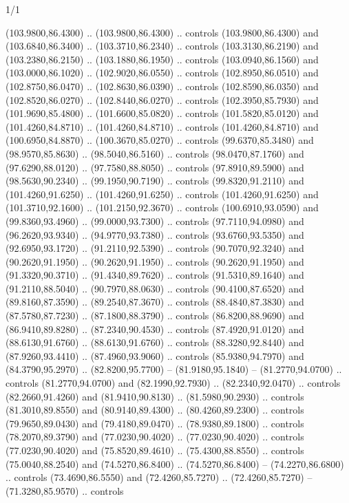 \begin{flagdescription}{1/1}
\begin{scope}[xshift=0.75\flaglength]
\begin{scope}[scale=0.00209\flagwidth,yshift=134.4mm,xshift=-29.7mm]
\begin{scope}[y=0.80pt, x=0.80pt, yscale=-1, xscale=1, inner sep=0pt, outer sep=0pt,line width=0.0015\flagwidth]
  (103.9800,86.4300) .. (103.9800,86.4300) .. controls (103.9800,86.4300) and
  (103.6840,86.3400) .. (103.3710,86.2340) .. controls (103.3130,86.2190) and
  (103.2380,86.2150) .. (103.1880,86.1950) .. controls (103.0940,86.1560) and
  (103.0000,86.1020) .. (102.9020,86.0550) .. controls (102.8950,86.0510) and
  (102.8750,86.0470) .. (102.8630,86.0390) .. controls (102.8590,86.0350) and
  (102.8520,86.0270) .. (102.8440,86.0270) .. controls (102.3950,85.7930) and
  (101.9690,85.4800) .. (101.6600,85.0820) .. controls (101.5820,85.0120) and
  (101.4260,84.8710) .. (101.4260,84.8710) .. controls (101.4260,84.8710) and
  (100.6950,84.8870) .. (100.3670,85.0270) .. controls (99.6370,85.3480) and
  (98.9570,85.8630) .. (98.5040,86.5160) .. controls (98.0470,87.1760) and
  (97.6290,88.0120) .. (97.7580,88.8050) .. controls (97.8910,89.5900) and
  (98.5630,90.2340) .. (99.1950,90.7190) .. controls (99.8320,91.2110) and
  (101.4260,91.6250) .. (101.4260,91.6250) .. controls (101.4260,91.6250) and
  (101.3710,92.1600) .. (101.2150,92.3670) .. controls (100.6910,93.0590) and
  (99.8360,93.4960) .. (99.0000,93.7300) .. controls (97.7110,94.0980) and
  (96.2620,93.9340) .. (94.9770,93.7380) .. controls (93.6760,93.5350) and
  (92.6950,93.1720) .. (91.2110,92.5390) .. controls (90.7070,92.3240) and
  (90.2620,91.1950) .. (90.2620,91.1950) .. controls (90.2620,91.1950) and
  (91.3320,90.3710) .. (91.4340,89.7620) .. controls (91.5310,89.1640) and
  (91.2110,88.5040) .. (90.7970,88.0630) .. controls (90.4100,87.6520) and
  (89.8160,87.3590) .. (89.2540,87.3670) .. controls (88.4840,87.3830) and
  (87.5780,87.7230) .. (87.1800,88.3790) .. controls (86.8200,88.9690) and
  (86.9410,89.8280) .. (87.2340,90.4530) .. controls (87.4920,91.0120) and
  (88.6130,91.6760) .. (88.6130,91.6760) .. controls (88.3280,92.8440) and
  (87.9260,93.4410) .. (87.4960,93.9060) .. controls (85.9380,94.7970) and
  (84.3790,95.2970) .. (82.8200,95.7700) -- (81.9180,95.1840) --
  (81.2770,94.0700) .. controls (81.2770,94.0700) and (82.1990,92.7930) ..
  (82.2340,92.0470) .. controls (82.2660,91.4260) and (81.9410,90.8130) ..
  (81.5980,90.2930) .. controls (81.3010,89.8550) and (80.9140,89.4300) ..
  (80.4260,89.2300) .. controls (79.9650,89.0430) and (79.4180,89.0470) ..
  (78.9380,89.1800) .. controls (78.2070,89.3790) and (77.0230,90.4020) ..
  (77.0230,90.4020) .. controls (77.0230,90.4020) and (75.8520,89.4610) ..
  (75.4300,88.8550) .. controls (75.0040,88.2540) and (74.5270,86.8400) ..
  (74.5270,86.8400) -- (74.2270,86.6800) .. controls (73.4690,86.5550) and
  (72.4260,85.7270) .. (72.4260,85.7270) -- (71.3280,85.9570) .. controls

\end{scope}
\end{scope}
\end{scope}
\end{flagdescription}

